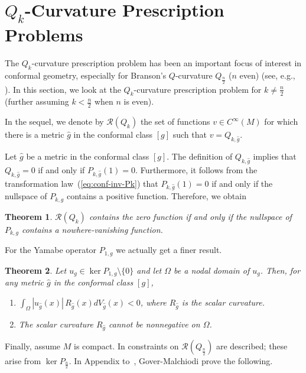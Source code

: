 \documentclass{amsart}
\newtheorem{theorem}{Theorem}[section]
\theoremstyle{definition}
\theoremstyle{remark}
\begin{document}
\section{$Q_{k}$-Curvature Prescription Problems} \label{sec:Qk-curvature}
The $Q_{k}$-curvature prescription problem has been an
important focus of interest in conformal geometry, especially for Branson's $Q$-curvature $Q_{\frac{n}{2}}$ ($n$ even) 
(see, e.g., \cite{BaFaRe,Brendle,DM}).  
In this section, we look at the
$Q_{k}$-curvature prescription problem for $k\neq \frac{n}{2}$
(further assuming $k<\frac{n}{2}$ when $n$ is even).

In the sequel, we denote by ${{\mathcal{R}}}(Q_{k})$ the set of functions $v \in C^{\infty}(M)$ for which there is a metric $\hat{g}$ in the 
conformal class $[g]$ such that $v=Q_{k,\hat{g}}$. 

Let $\hat{g}$ be a metric in the conformal class $[g]$. The definition of $Q_{k,\hat{g}}$ implies that 
$Q_{k,\hat{g}}=0$ if and only if $P_{k,\hat{g}}(1)=0$. Furthermore, it follows from the 
transformation law~(\ref{eq:conf-inv-Pk}) that $P_{k,\hat{g}}(1)=0$ if and only if the nullspace of $P_{k,g}$ contains a positive 
function. Therefore, we obtain

\begin{theorem}\label{Pk:kernel:const}
${{\mathcal{R}}}(Q_{k})$ contains the zero function if and only if the nullspace
  of $P_{k,g}$ contains a nowhere-vanishing function.
\end{theorem}

For the Yamabe operator $P_{1,g}$ we actually get a finer result. 
\begin{theorem}\label{int:negative}
Let $u_{g}\in \ker P_{1,g}\setminus \{0\}$ and let $\Omega$ be a nodal domain of $u_{g}$. Then, for any metric $\hat{g}$ in the 
conformal class $[g]$, 
\begin{enumerate}
    \item ${\displaystyle \int_\Omega |u_{\hat{g}}(x)|\, R_{\hat g}(x)dV_{\hat g}(x) <0}$, where $R_{\hat{g}}$ is the 
    scalar curvature.

    \item  The scalar curvature $R_{\hat{g}}$ cannot be nonnegative on $\Omega$. 
\end{enumerate}     
\end{theorem}

Finally, assume $M$ is compact. In \cite{Gov10} constraints on 
$\mathcal{R}(Q_{\frac{n}{2}})$ are described; these arise from 
$\ker P_{\frac{n}{2}}$.  In Appendix to~\cite{CGJP1},
Gover-Malchiodi prove the following.
\end{document}
